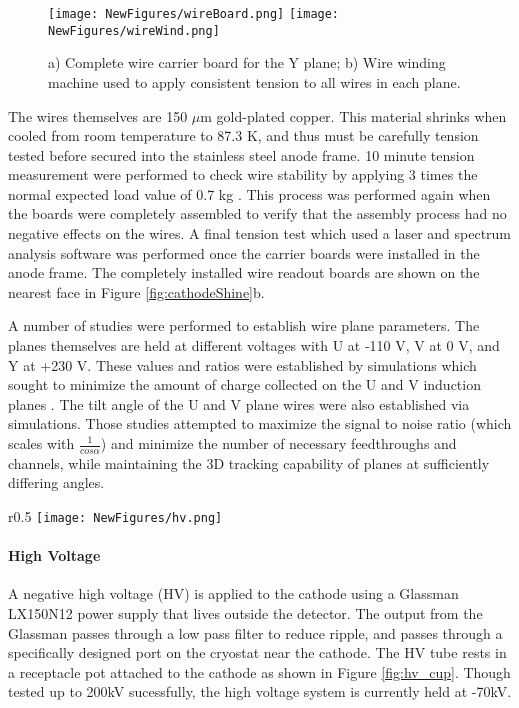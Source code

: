 \documentclass[12pt]{article}
\begin{document}
\begin{figure}[h!]
\centering
\texttt{[image: NewFigures/wireBoard.png]}
\hspace{3 mm} 
\texttt{[image: NewFigures/wireWind.png]}
\caption{ a) Complete wire carrier board for the Y plane; b) Wire winding machine used to apply consistent tension to all wires in each plane. }
\label{fig:wire_stuff}
\end{figure}

\par The wires themselves are 150 $\mu$m gold-plated copper.  This material shrinks when cooled from room temperature to 87.3 K, and thus must be carefully tension tested before secured into the stainless steel anode frame. 10 minute tension measurement were performed to check wire stability by applying 3 times the normal expected load value of 0.7 kg \cite{bib:uboone_JINST}.  This process was performed again when the boards were completely assembled to verify that the assembly process had no negative effects on the wires. A final tension test which used a laser and spectrum analysis software was performed once the carrier boards were installed in the anode frame. The completely installed wire readout boards are shown on the nearest face in Figure \ref{fig:cathodeShine}b.

\par A number of studies were performed to establish wire plane parameters. The planes themselves are held at different voltages with U at -110 V, V at 0 V, and Y at +230 V.  These values and ratios were established by simulations which sought to minimize the amount of charge collected on the U and V induction planes \cite{bib:uboone_proposal} \cite{bib:tdr}.  The tilt angle of the U and V plane wires were also established via simulations.  Those studies attempted to maximize the signal to noise ratio (which scales with $\frac{1}{cos\alpha}$) and minimize the number of necessary feedthroughs and channels, while maintaining the 3D tracking capability of planes at sufficiently differing angles.

\begin{wrapfigure}{r}{0.5\textwidth}
\centering
\texttt{[image: NewFigures/hv.png]}
\caption{ MicroBooNE HV feedthrough resting in the receptacle cup attached to the cathode. } 
\label{fig:hv_cup}
\end{wrapfigure}

\paragraph{High Voltage}
\par A negative high voltage (HV) is applied to the cathode using a Glassman LX150N12 power supply that lives outside the detector.  The output from the Glassman passes through a low pass filter to reduce ripple, and passes through a specifically designed port on the cryostat near the cathode.  The HV tube rests in a receptacle pot attached to the cathode as shown in Figure \ref{fig:hv_cup}.
\noindent Though tested up to 200kV sucessfully, the high voltage system is currently held at -70kV.
\end{document}
